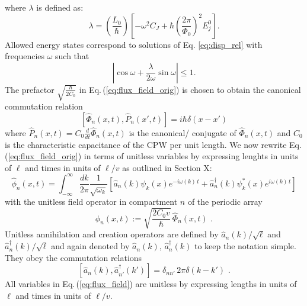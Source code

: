 %
where $\lambda$ is defined as:
%
\begin{equation}\label{eq:lambda}
\lambda = \left(\frac{L_0}{\hbar}\right)  
\left[-\omega^2 C_{J}+\hbar\left(\frac{2 \pi}{\Phi_{0}}\right)^{2} E_{j}^0\right].
\end{equation}
%
%
Allowed energy states correspond to solutions of Eq. \ref{eq:disp_rel} with frequencies $\omega$ such that
%
\begin{equation}\label{eq:bands_condition}
    \left|\cos{\omega} + \frac{\lambda}{2\omega}\sin{\omega}\right|\leq 1.
\end{equation}
%
The prefactor $\displaystyle{\sqrt{\frac{\hbar}{2 C_0}}}$ in Eq.\,(\ref{eq:flux_field_orig}) is chosen 
to obtain the canonical commutation relation 
%
\begin{equation} \label{eq:commrelphi}
\left[ \hat{\Phi}_n(x,t), \hat{P}_n(x',t) \right] = i \hbar \delta(x-x')
\end{equation}
%
where $\hat{P}_n(x,t) = C_0 \displaystyle{\frac{d}{dt}} \hat{\Phi}_n(x,t)$ is the 
canonical/ conjugate of $\hat{\Phi}_n(x,t)$ and $C_0$ is the characteristic capacitance of the CPW per unit length. 
%
We now rewrite Eq.\,(\ref{eq:flux_field_orig}) in terms of unitless variables 
by expressing lenghts in units of $\ell$ and times in units of $\ell/v$
as outlined in \color{red} Section X:  \color{black}  
%
\begin{equation} \label{eq:flux_field}
    \hat{\phi}_n(x,t) = 
    \int_{-\infty}^{\infty}\frac{dk}{2 \pi} \frac{1}{\sqrt{\omega_k}}
    \left[ \hat{a}_n(k) \psi_k(x)e^{-i \omega(k) \, t} + 
    \hat{a}_n^{\dagger}(k) \psi_k^*(x) e^{i \omega(k) \, t} \right]
\end{equation}
%
with the unitless field operator in compartment $n$ of the periodic array
%
\begin{equation} \label{eq:ufo}
\hat{\phi}_n(x,t) := \sqrt{\frac{2 C_0 v}{\hbar}} \, \hat{\Phi}_n(x,t) \, \, .
\end{equation}
%
Unitless annihilation and creation operators are defined by $\hat{a}_n(k)/\sqrt{\ell}$ 
and ${\hat a}_{n}^\dagger(k) / \sqrt{\ell}$ and again denoted by
$\hat{a}_n(k)$, ${\hat a}_{n}^\dagger(k)$ to keep the notation simple. 
They obey the commutation relations 
%
\begin{equation} \label{eq:cra}
    \left[ \hat{a}_n(k),{\hat a}_{n'}^\dagger(k') \right] = \delta_{nn'} \, 2 \pi \delta(k - k') \, \, .
\end{equation}
%
All variables in Eq.\,(\ref{eq:flux_field}) are unitless by expressing lengths in units of $\ell$
and times in units of $\ell/v$.

